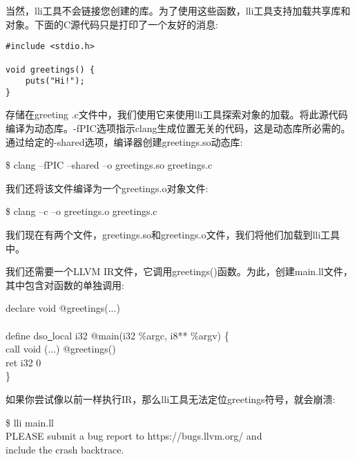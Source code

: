 当然，lli工具不会链接您创建的库。为了使用这些函数，lli工具支持加载共享库和对象。下面的C源代码只是打印了一个友好的消息:\par

\begin{lstlisting}[caption={}]
#include <stdio.h>

void greetings() {
	puts("Hi!");
}
\end{lstlisting}

存储在greeting .c文件中，我们使用它来使用lli工具探索对象的加载。将此源代码编译为动态库。-fPIC选项指示clang生成位置无关的代码，这是动态库所必需的。通过给定的-shared选项，编译器创建greetings.so动态库:\par

\begin{tcolorbox}[colback=white,colframe=black]
\$ clang –fPIC –shared –o greetings.so greetings.c
\end{tcolorbox}

我们还将该文件编译为一个greetings.o对象文件:\par

\begin{tcolorbox}[colback=white,colframe=black]
\$ clang –c –o greetings.o greetings.c
\end{tcolorbox}

我们现在有两个文件，greetings.so和greetings.o文件，我们将他们加载到lli工具中。\par

我们还需要一个LLVM IR文件，它调用greetings()函数。为此，创建main.ll文件，其中包含对函数的单独调用:\par

\begin{tcolorbox}[colback=white,colframe=black]
declare void @greetings(...) \\
\\
define dso\underline{~}local i32 @main(i32 \%argc, i8** \%argv) \{ \\
\hspace*{0.5cm}call void (...) @greetings() \\
\hspace*{0.5cm}ret i32 0 \\
\}
\end{tcolorbox}

如果你尝试像以前一样执行IR，那么lli工具无法定位greetings符号，就会崩溃:\par

\begin{tcolorbox}[colback=white,colframe=black]
\$ lli main.ll \\
PLEASE submit a bug report to https://bugs.llvm.org/ and \\
include the crash backtrace.
\end{tcolorbox}

